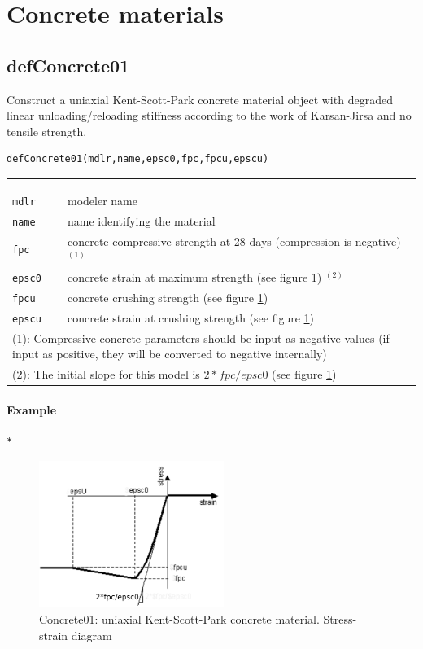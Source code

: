 \section{Concrete materials}
\subsection{defConcrete01}
\noindent Construct a uniaxial Kent-Scott-Park concrete material object with degraded linear unloading/reloading stiffness according to the work of Karsan-Jirsa and no tensile strength.
\begin{verbatim}
defConcrete01(mdlr,name,epsc0,fpc,fpcu,epscu)
\end{verbatim}
\vspace{-10pt}
{\color{grayLines} \rule{\linewidth}{0.25pt}}
\begin{center}
\begin{tabular}{lp{10cm}}
{\tt mdlr} & modeler name \\
{\tt name} & name identifying the material \\
{\tt fpc} &  concrete compressive strength at 28 days (compression is negative) $^{(1)}$\\
{\tt epsc0} &  concrete strain at maximum strength (see figure \ref{Concrete01}) $^{(2)}$\\
{\tt fpcu} &  concrete crushing strength (see figure \ref{Concrete01}) \\
{\tt epscu} &  concrete strain at crushing strength (see figure \ref{Concrete01}) \\
\hline
\multicolumn{2}{p{12cm}}{\footnotesize(1): Compressive concrete parameters should be input as negative values (if input as positive, they will be converted to negative internally)}\\
\multicolumn{2}{p{12cm}}{\footnotesize (2): The initial slope for this model is $2*fpc/epsc0$ (see figure \ref{Concrete01})}\\
\end{tabular}
\end{center}
\paragraph{Example}
\begin{verbatim}
*
\end{verbatim}

\begin{figure}[h]
\centering
\includegraphics[width=60mm]{materials/figures/Concrete01}
\caption{Concrete01: uniaxial Kent-Scott-Park concrete material. Stress-strain diagram}\label{Concrete01}
\end{figure}

